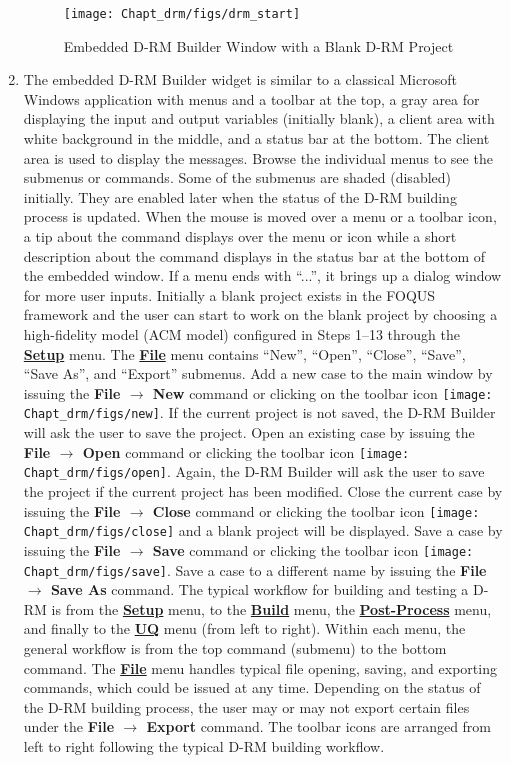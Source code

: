 \begin{enumerate}
	\begin{figure}[H]
		\begin{center}
			\texttt{[image: Chapt\_drm/figs/drm\_start]}
			\caption{Embedded D-RM Builder Window with a Blank D-RM Project}
			\label{fig.drm_start}
		\end{center}
	\end{figure}
	\item The embedded D-RM Builder widget is similar to a classical Microsoft Windows application with menus and a toolbar at the top, a gray area for displaying the input and output variables (initially blank), a client area with white background in the middle, and a status bar at the bottom.  The client area is used to display the messages.  Browse the individual menus to see the submenus or commands.  Some of the submenus are shaded (disabled) initially.  They are enabled later when the status of the D-RM building process is updated.  When the mouse is moved over a menu or a toolbar icon, a tip about the command displays over the menu or icon while a short description about the command displays in the status bar at the bottom of the embedded window.  If a menu ends with ``...'', it brings up a dialog window for more user inputs.  Initially a blank project exists in the FOQUS framework and the user can start to work on the blank project by choosing a high-fidelity model (ACM model) configured in Steps 1--13 through the \textbf{\underline{Setup}} menu.  The \textbf{\underline{File}} menu contains ``New'', ``Open'', ``Close'', ``Save'', ``Save As'', and ``Export'' submenus.  Add a new case to the main window by issuing the \textbf{File $\rightarrow$ New} command or clicking on the toolbar icon \texttt{[image: Chapt\_drm/figs/new]}.  If the current project is not saved, the D-RM Builder will ask the user to save the project.  Open an existing case by issuing the \textbf{File $\rightarrow$ Open} command or clicking the toolbar icon \texttt{[image: Chapt\_drm/figs/open]}.  Again, the D-RM Builder will ask the user to save the project if the current project has been modified.  Close the current case by issuing the \textbf{File $\rightarrow$ Close} command or clicking the toolbar icon \texttt{[image: Chapt\_drm/figs/close]} and a blank project will be displayed.  Save a case by issuing the \textbf{File $\rightarrow$ Save} command or clicking the toolbar icon \texttt{[image: Chapt\_drm/figs/save]}.  Save a case to a different name by issuing the \textbf{File $\rightarrow$ Save As} command.  The typical workflow for building and testing a D-RM is from the \textbf{\underline{Setup}} menu, to the \textbf{\underline{Build}} menu, the \textbf{\underline{Post-Process}} menu, and finally to the \textbf{\underline{UQ}} menu (from left to right).  Within each menu, the general workflow is from the top command (submenu) to the bottom command.  The \textbf{\underline{File}} menu handles typical file opening, saving, and exporting commands, which could be issued at any time.  Depending on the status of the D-RM building process, the user may or may not export certain files under the \textbf{File $\rightarrow$ Export} command.  The toolbar icons are arranged from left to right following the typical D-RM building workflow.

\end{enumerate}
